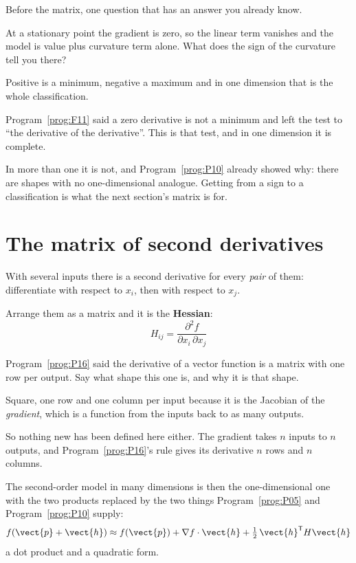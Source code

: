 \begin{fr}
Before the matrix, one question that has an answer you already know.

At a stationary point the gradient is zero, so the linear term vanishes and
the model is value plus curvature term alone. What does the sign of the
curvature tell you there?
\nextframe
\end{fr}

\begin{fr}
\begin{ansblock}
Positive is a minimum, negative a maximum \dash{} and in one dimension that
is the whole classification.
\end{ansblock}

Program~\ref{prog:F11} said a zero derivative is not a minimum and left the
test to \enquote{the derivative of the derivative}. This is that test, and in
one dimension it is complete.

In more than one it is not, and Program~\ref{prog:P10} already showed why:
there are shapes with no one-dimensional analogue. Getting from a sign to a
classification is what the next section's matrix is for.
\end{fr}

\section{The matrix of second derivatives}
\label{sec:P17-hessian}

\begin{fr}
With several inputs there is a second derivative for every \emph{pair} of
them: differentiate with respect to $x_i$, then with respect to $x_j$.

Arrange them as a matrix and it is the \textbf{Hessian}:
\[ H_{ij} = \frac{\partial^{2} f}{\partial x_i \, \partial x_j} \]

Program~\ref{prog:P16} said the derivative of a vector function is a matrix
with one row per output. Say what shape this one is, and why it is that shape.
\dotline
\nextframe
\end{fr}

\begin{fr}
\begin{ansblock}
Square, one row and one column per input \dash{} because it is the Jacobian of
the \emph{gradient}, which is a function from the inputs back to as many
outputs.
\end{ansblock}

So nothing new has been defined here either. The gradient takes $n$ inputs to
$n$ outputs, and Program~\ref{prog:P16}'s rule gives its derivative $n$ rows
and $n$ columns.

The second-order model in many dimensions is then the one-dimensional one with
the two products replaced by the two things
Program~\ref{prog:P05} and Program~\ref{prog:P10} supply:
\[ f(\vect{p} + \vect{h}) \approx f(\vect{p})
   + \nabla f \cdot \vect{h}
   + \tfrac{1}{2}\, \vect{h}^{\mathsf{T}} H \vect{h} \]
a dot product and a quadratic form.
\end{fr}

